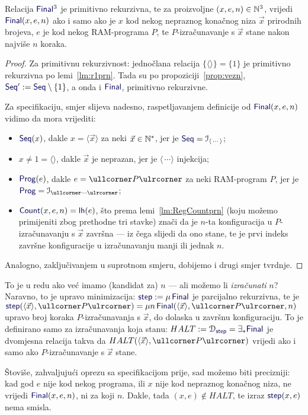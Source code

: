 \begin{lema}\label{lm:Finalspec}
Relacija $\f{Final}^3$ je primitivno rekurzivna, te
za proizvoljne $(x,e,n)\in{\mathbb N}^3$, vrijedi $\f{Final}(x,e,n)$ ako i samo ako je $x$ kod nekog nepraznog konačnog niza $\vec x$ prirodnih brojeva, $e$ je kod nekog RAM-programa $P$, te $P$-izračunavanje s $\vec x$ stane nakon najviše $n$ koraka.
\end{lema}
\begin{proof}
Za primitivnu rekurzivnost: jednočlana relacija $\{\langle\rangle\}=\{1\}$ je primitivno rekurzivna po lemi~\ref{lm:r1prn}. Tada su po propoziciji~\ref{prop:vezn}, $\f{Seq'}:=\f{Seq}\setminus\{1\}$, a onda i $\f{Final}$, primitivno rekurzivne.

Za specifikaciju, smjer slijeva nadesno, raspetljavanjem definicije od $\f{Final}(x,e,n)$ vidimo da mora vrijediti:
\begin{itemize}
    \item $\f{Seq}(x)$, dakle $x=\langle\vec x\rangle$ za neki $\vec x\in{\mathbb N}^*$, jer je $\f{Seq}=\im{\langle\,\cdots\rangle}$;
    \item $x\not=1=\langle\rangle$, dakle $\vec x$ je neprazan, jer je $\langle\,\cdots\rangle$ injekcija;
    \item $\f{Prog}(e)$, dakle $e=\kprog{P}$ za neki RAM-program $P$, jer je $\f{Prog}=\im{\kprog{\cdots}}$;
    \item $\f{Count}(x,e,n)=\f{lh}(e)$, što prema lemi~\ref{lm:RegCountprn} (koju možemo primijeniti zbog prethodne tri stavke) znači da je $n$-ta konfiguracija u $P$-izračunavanju s $\vec x$ završna --- iz čega slijedi da ono stane, te je prvi indeks završne konfiguracije u izračunavanju manji ili jednak $n$.
\end{itemize}
Analogno, zaključivanjem u suprotnom smjeru, dobijemo i drugi smjer tvrdnje.
\end{proof}

To je u redu ako već imamo (kandidat za) $n$ --- ali možemo li \emph{izračunati} $n$? Naravno, to je upravo minimizacija:  $\f{step}:=\mu\,\f{Final}$ je parcijalno rekurzivna, te je $\f{step}(\langle\vec x\rangle,\kprog P)=\mu n\,\f{Final}(\langle\vec x\rangle,\kprog{P},n)$ upravo broj koraka $P$-izračunavanja s $\vec x$, do dolaska u završnu konfiguraciju. To je definirano samo za izračunavanja koja stanu: $HALT:=\dom{\f{step}}=\exists_*\f{Final}$ je dvomjesna relacija takva da $HALT(\langle \vec x\rangle,\kprog P)$ vrijedi ako i samo ako $P$-izračunavanje s $\vec x$ stane.

\begin{napomena}\label{nap:HaltProg}
Štoviše, zahvaljujući oprezu sa specifikacijom prije, sad možemo biti precizniji: kad god $e$ nije kod nekog programa, ili $x$ nije kod nepraznog konačnog niza, ne vrijedi  $\f{Final}(x,e,n)$, ni za koji $n$. Dakle, tada $(x,e)\not\in HALT$, te izraz $\f{step}(x,e)$ nema smisla.
\end{napomena}

